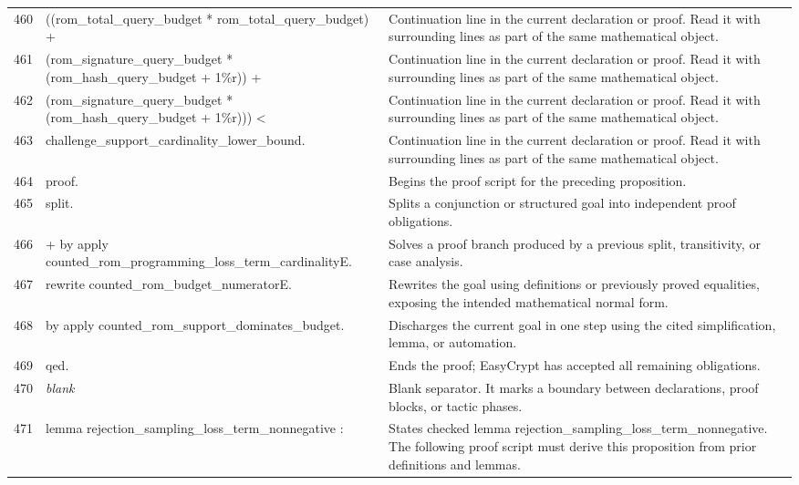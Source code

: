 \documentclass[10pt]{article}
\begin{document}
\begin{longtable}{r L{0.53\textwidth} L{0.37\textwidth}}
460 & {\ttfamily\scriptsize   ((rom\_total\_query\_budget * rom\_total\_query\_budget) +} & Continuation line in the current declaration or proof.  Read it with surrounding lines as part of the same mathematical object. \\
461 & {\ttfamily\scriptsize    (rom\_signature\_query\_budget * (rom\_hash\_query\_budget + 1\%r)) +} & Continuation line in the current declaration or proof.  Read it with surrounding lines as part of the same mathematical object. \\
462 & {\ttfamily\scriptsize    (rom\_signature\_query\_budget * (rom\_hash\_query\_budget + 1\%r))) <} & Continuation line in the current declaration or proof.  Read it with surrounding lines as part of the same mathematical object. \\
463 & {\ttfamily\scriptsize   challenge\_support\_cardinality\_lower\_bound.} & Continuation line in the current declaration or proof.  Read it with surrounding lines as part of the same mathematical object. \\
464 & {\ttfamily\scriptsize proof.} & Begins the proof script for the preceding proposition. \\
465 & {\ttfamily\scriptsize split.} & Splits a conjunction or structured goal into independent proof obligations. \\
466 & {\ttfamily\scriptsize + by apply counted\_rom\_programming\_loss\_term\_cardinalityE.} & Solves a proof branch produced by a previous split, transitivity, or case analysis. \\
467 & {\ttfamily\scriptsize rewrite counted\_rom\_budget\_numeratorE.} & Rewrites the goal using definitions or previously proved equalities, exposing the intended mathematical normal form. \\
468 & {\ttfamily\scriptsize by apply counted\_rom\_support\_dominates\_budget.} & Discharges the current goal in one step using the cited simplification, lemma, or automation. \\
469 & {\ttfamily\scriptsize qed.} & Ends the proof; EasyCrypt has accepted all remaining obligations. \\
470 & {\ttfamily\scriptsize \emph{blank}} & Blank separator.  It marks a boundary between declarations, proof blocks, or tactic phases. \\
471 & {\ttfamily\scriptsize lemma rejection\_sampling\_loss\_term\_nonnegative :} & States checked lemma rejection\_sampling\_loss\_term\_nonnegative.  The following proof script must derive this proposition from prior definitions and lemmas. \\

\end{longtable}
\end{document}
